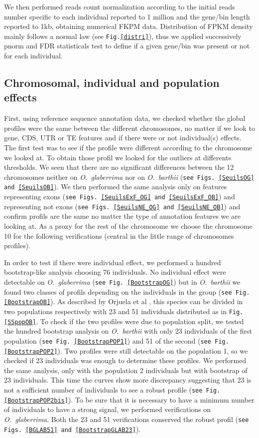 \documentclass[10pt,letterpaper]{article}
\begin{document}
We then performed reads count normalization according to the initial reads number specific to each individual reported to 1 million and the gene/bin length reported to 1kb, obtaining numerical FKPM data. Distribution of FPKM density mainly follows a normal law (see \texttt{Fig.\ref{distri}}), thus we applied successively pnorm and FDR statisticals test to define if a given gene/bin was present or not for each individual.

  \subsection*{Chromosomal, individual and population effects}
  First, using reference sequence annotation data, we checked whether the global profiles were the same between the different chromosomes, no matter if we look to gene, CDS, UTR or TE features and if there were or not individual(s) effects. The first test was to see if the profile were different according to the chromosome we looked at. To obtain those profil we looked for the outliers at differents thresholds. 
  We seen that there are no significant differences between the 12 chromosomes neither on \emph{O.~glaberrima} nor on \emph{O.~barthii} (\texttt{see Figs.~\ref{SeuilsOG} and \ref{SeuilsOB}}).
  We then performed the same analysis only on features representing exons (\texttt{see Figs.~\ref{SeuilsExF_OG} and \ref{SeuilsExF_OB}}) and representing not exons (\texttt{see Figs.~\ref{SeuilsNE_OG} and \ref{SeuilsNE_OB}}) and confirm profils are the same no matter the type of annotation features we are looking at. As a proxy for the rest of the chromosome we choose the chromosome 10 for the following verifications (central in the little range of chromosomes profiles).
  
  In order to test if there were individual effect, we performed a hundred bootstrap-like analysis choosing 76 individuals.
  No individual effect were detectable on \emph{O.~glaberrima} (\texttt{see Fig. \ref{BootstrapOG}}) but in \emph{O.~barthii} we found two classes of profils depending on the individuals in the group 
  (\texttt{see Fig. \ref{BootstrapOB}}).
  As described by Orjuela et al \cite{Orjuela2014}, this species can be divided in two populations respectively with 23 and 51 individuals distributed as in \texttt{Fig. \ref{SSpopOB}}.
  To check if the two profiles were due to population split, we tested the hundred bootstrap analysis on \emph{O.~barthii} with only 23 individuals of the first population (\texttt{see Fig. \ref{BootstrapPOP1}}) 
  and 51 of the second (\texttt{see Fig. \ref{BootstrapPOP2}}).
  Two profiles were still detectable on the population 1, so we checked if 23 individuals was enough to determine these profiles. We performed the same analysis, only with the population 2 individuals but
  with bootstrap of 23 individuals. This time the curves show more discrepancy suggesting that 23 is not a sufficient number of individuals to see a robust profile (\texttt{see Fig. \ref{BootstrapPOP2bis}}).
  To be sure that it is necessary to have a minimum number of individuals to have a strong signal, we performed verifications on \emph{O.~glaberrima}. Both the 23 and 51 verifications conserved the robust profil 
  (\texttt{see Figs. \ref{BGLAB51} and \ref{BootstrapGLAB23}}).
  
\end{document}
